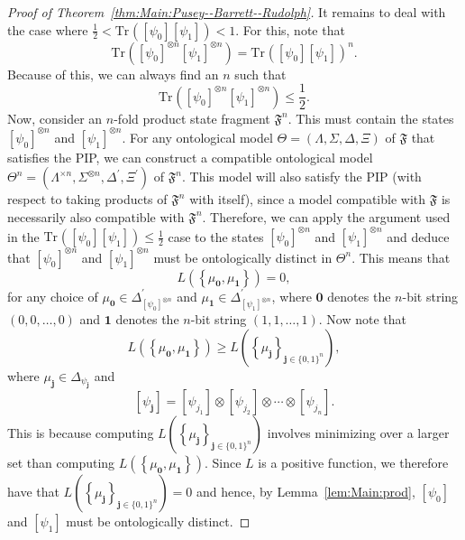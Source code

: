 \documentclass[DIV=calc,paper=a4,fontsize=11pt,twocolumn]{scrartcl} %
\theoremstyle{definition}
\theoremstyle{plain}
\newcommand{\Proj}[1]{\ensuremath{\left [ #1 \right ]}}
\newcommand{\Tr}[2][]{\ensuremath{\text{Tr}_{#1} \left ( #2 \right )}}
\begin{document}
\begin{proof}[Proof of Theorem~\ref{thm:Main:Pusey--Barrett--Rudolph}]
It remains to deal with the case where $\frac{1}{2}<\Tr{\Proj{\psi_0}\Proj{\psi_1}}<1$. For this, note that
\begin{equation}
\Tr{\Proj{\psi_0}^{\otimes n} \Proj{\psi_1}^{\otimes n}} =
\Tr{\Proj{\psi_0} \Proj{\psi_1}}^n.
\end{equation}
Because of this, we can always find an $n$ such that
\begin{equation}
\Tr{\Proj{\psi_0}^{\otimes n} \Proj{\psi_1}^{\otimes n}} \leq
\frac{1}{2}.
\end{equation}
Now, consider an $n$-fold product state fragment $\mathfrak{F}^n$.
This must contain the states $\Proj{\psi_0}^{\otimes n}$ and
$\Proj{\psi_1}^{\otimes n}$.  For any ontological model $\Theta =
(\Lambda, \Sigma, \Delta, \Xi)$ of $\mathfrak{F}$ that satisfies the
PIP, we can construct a compatible ontological model $\Theta^n =
(\Lambda^{\times n}, \Sigma^{\otimes n}, \Delta^{\prime},
\Xi^{\prime})$ of $\mathfrak{F}^n$.  This model will also satisfy
the PIP (with respect to taking products of $\mathfrak{F}^n$ with
itself), since a model compatible with $\mathfrak{F}$ is necessarily
also compatible with $\mathfrak{F}^n$.  Therefore, we can apply the
argument used in the $\Tr{\Proj{\psi_0}\Proj{\psi_1}} \leq
\frac{1}{2}$ case to the states $\Proj{\psi_0}^{\otimes n}$ and
$\Proj{\psi_1}^{\otimes n}$ and deduce that $\Proj{\psi_0}^{\otimes
n}$ and $\Proj{\psi_1}^{\otimes n}$ must be ontologically distinct
in $\Theta^n$.  This means that
\begin{equation}
L \left ( \left \{ \mu_{\bm{0}}, \mu_{\bm{1}} \right \}
\right ) = 0,
\end{equation}
for any choice of $\mu_{\bm{0}} \in
\Delta^{\prime}_{\Proj{\psi_0}^{\otimes n}}$ and $\mu_{\bm{1}} \in
\Delta^{\prime}_{\Proj{\psi_1}^{\otimes n}}$, where $\bm{0}$ denotes
the $n$-bit string $(0,0,\ldots,0)$ and $\bm{1}$ denotes the $n$-bit
string $(1,1,\ldots,1)$.  Now note that
\begin{equation}
L \left ( \left \{ \mu_{\bm{0}}, \mu_{\bm{1}} \right \} \right )
\geq L \left ( \left \{ \mu_{\bm{j}}\right \}_{\bm{j} \in
\{0,1\}^n}\right ),
\end{equation}
where $\mu_{\bm{j}} \in \Delta_{\psi_{\bm{j}}}$ and
\begin{equation}
\Proj{\psi_{\bm{j}}} = \Proj{\psi_{j_1}} \otimes
\Proj{\psi_{j_2}} \otimes \cdots \otimes \Proj{\psi_{j_n}}.
\end{equation}
This is because computing $L \left ( \left \{ \mu_{\bm{j}}\right
\}_{\bm{j} \in \{0,1\}^n}\right )$ involves minimizing over a
larger set than computing $ L \left ( \left \{ \mu_{\bm{0}},
\mu_{\bm{1}} \right \} \right )$.  Since $L$ is a positive
function, we therefore have that $L \left ( \left \{
\mu_{\bm{j}}\right \}_{\bm{j} \in \{0,1\}^n}\right ) = 0$ and
hence, by Lemma~\ref{lem:Main:prod}, $\Proj{\psi_0}$ and
$\Proj{\psi_1}$ must be ontologically distinct.
\end{proof}
\end{document}
